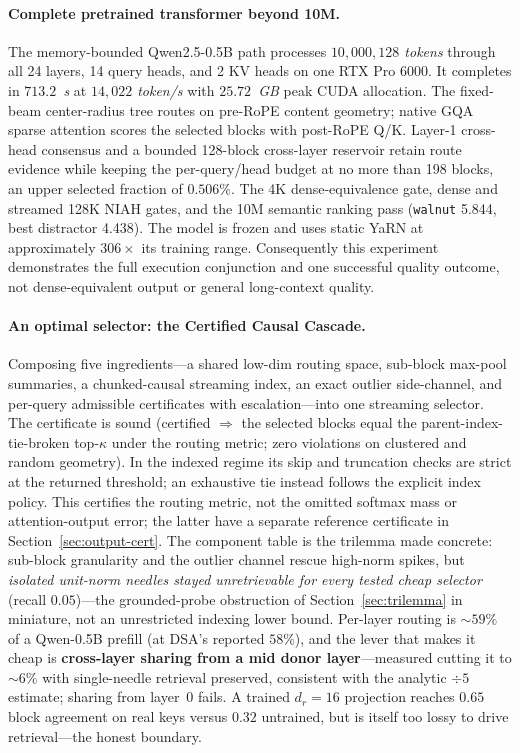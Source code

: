 \documentclass[11pt]{article}
\numberwithin{equation}{section}
\begin{document}
\paragraph{Complete pretrained transformer beyond 10M.} The memory-bounded Qwen2.5-0.5B path processes
\emph{$10{,}000{,}128$ tokens} through all 24 layers, 14 query heads, and 2 KV heads on one RTX Pro 6000. It
completes in \emph{$713.2$~s} at \emph{$14{,}022$ token/s} with \emph{$25.72$~GB} peak CUDA allocation. The
fixed-beam center-radius tree routes on pre-RoPE content geometry; native GQA sparse attention scores the
selected blocks with post-RoPE Q/K. Layer-1 cross-head consensus and a bounded 128-block cross-layer reservoir
retain route evidence while keeping the per-query/head budget at no more than 198 blocks, an upper selected
fraction of \emph{$0.506\%$}. The 4K dense-equivalence gate, dense and streamed 128K NIAH gates, and the 10M
semantic ranking pass (\texttt{walnut} 5.844, best distractor 4.438). The model is frozen and uses static YaRN
at approximately $306\times$ its training range. Consequently this experiment demonstrates the full execution
conjunction and one successful quality outcome, not dense-equivalent output or general long-context quality.

\paragraph{An optimal selector: the Certified Causal Cascade.} Composing five ingredients---a shared low-dim
routing space, sub-block max-pool summaries, a chunked-causal streaming index, an exact outlier side-channel,
and per-query admissible certificates with escalation---into one streaming selector. The certificate is sound
(certified $\Rightarrow$ the selected blocks equal the parent-index-tie-broken top-$\kappa$ under the routing
metric; zero violations on clustered and random geometry). In the indexed regime its skip and truncation
checks are strict at the returned threshold; an exhaustive tie instead follows the explicit index policy.
This certifies the routing metric, not the omitted
softmax mass or attention-output error; the latter have a separate reference certificate in
Section~\ref{sec:output-cert}. The component table is the trilemma made concrete:
sub-block granularity and the outlier channel rescue high-norm spikes, but \emph{isolated unit-norm needles
stayed unretrievable for every tested cheap selector} (recall $0.05$)---the grounded-probe obstruction of
Section~\ref{sec:trilemma} in miniature, not an unrestricted indexing lower bound. Per-layer routing is
${\sim}59\%$ of a Qwen-0.5B prefill (at DSA's reported $58\%$), and
the lever that makes it cheap is \textbf{cross-layer sharing from a mid donor layer}---measured cutting it to
${\sim}6\%$ with single-needle retrieval preserved, consistent with the analytic $\div 5$ estimate; sharing
from layer~0 fails. A trained $d_r{=}16$ projection reaches $0.65$ block agreement on real keys versus $0.32$
untrained, but is itself too lossy to drive retrieval---the honest boundary.
\end{document}

